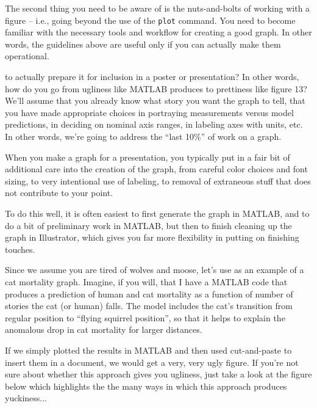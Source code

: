 \documentclass{tufte-handout}
\begin{document}
The second thing you need to be aware of is the nuts-and-bolts of working with a figure -- i.e., going beyond the use of the {\tt plot} command.  You need to become familiar with the necessary tools and workflow for creating a good graph. In other words, the guidelines above are useful only if you can actually make them operational.


 to actually prepare it for inclusion in a poster or presentation?  In other words, how do you go from ugliness like MATLAB produces to prettiness like figure 13? We'll  assume that you already know what story you want the graph to tell, that you have made appropriate choices in portraying measurements versus model predictions, in deciding on nominal axis ranges, in labeling axes with units, etc. In other words, we're going to address the ``last 10\%'' of work on a graph. 

When you make a graph for a presentation, you typically put in a fair bit of additional care into the creation of the graph, from careful color choices and font sizing, to very intentional use of labeling, to removal of extraneous stuff that does not contribute to your point.

To do this well, it is often easiest to first generate the graph in MATLAB, and to do a bit of preliminary work in MATLAB, but then to finish cleaning up the graph in Illustrator, which gives you far more flexibility in putting on finishing touches.

Since we assume you are tired of wolves and moose, let's use as an example of a cat mortality graph.  Imagine, if you will, that I have a MATLAB code that produces a prediction of human and cat mortality as a function of number of stories the cat (or human) falls.  The model includes the cat's transition from regular position to ``flying squirrel position'', so that it helps to explain the anomalous drop in cat mortality for larger distances.

If we simply plotted the results in MATLAB and then used cut-and-paste to insert them in a document, we would get a very, very ugly figure.  If you're not sure about whether this approach gives you ugliness, just take a look at the figure below which highlights the the many ways in which this approach produces yuckiness...
\end{document}

